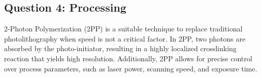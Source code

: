 \subsection{Question 4: Processing}

2-Photon Polymerization (2PP) is a suitable technique to replace traditional photolithography when speed is not a critical factor. In 2PP, two photons are absorbed by the photo-initiator, resulting in a highly localized crosslinking reaction that yields high resolution. Additionally, 2PP allows for precise control over process parameters, such as laser power, scanning speed, and exposure time. 
